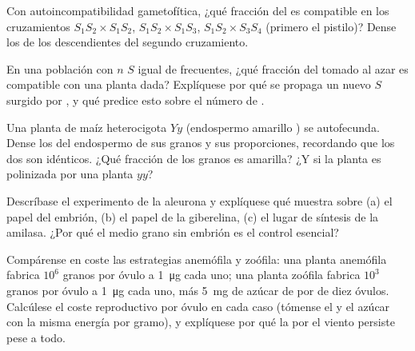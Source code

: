 \begin{exercise}[$\star\star$]\label{exo:b2:angiosperm-reproduction:6}
Con autoincompatibilidad gametofítica, ¿qué fracción del  es
compatible en los cruzamientos $S_1S_2\times S_1S_2$, $S_1S_2\times
S_1S_3$, $S_1S_2\times S_3S_4$ (primero el pistilo)? Dense los
 de los descendientes del segundo cruzamiento.
\end{exercise}

\begin{exercise}[$\star\star$]\label{exo:b2:angiosperm-reproduction:7}
En una población con $n$  $S$ igual de frecuentes, ¿qué fracción
del  tomado al azar es compatible con una planta dada? Explíquese
por qué se propaga un nuevo  $S$ surgido por , y qué predice
esto sobre el número de .
\end{exercise}

\begin{exercise}[$\star\star$]\label{exo:b2:angiosperm-reproduction:8}
Una planta de maíz heterocigota $Yy$ (endospermo amarillo ) se
autofecunda. Dense los  del endospermo de sus granos y sus
proporciones, recordando que los dos  son idénticos. ¿Qué
fracción de los granos es amarilla? ¿Y si la planta es polinizada por una
planta $yy$?
\end{exercise}

\begin{exercise}[$\star\star$]\label{exo:b2:angiosperm-reproduction:9}
Descríbase el experimento de la aleurona y explíquese qué muestra sobre
(a) el papel del embrión, (b) el papel de la giberelina, (c) el lugar de
síntesis de la amilasa. ¿Por qué el medio grano sin embrión es el
control esencial?
\end{exercise}

\begin{exercise}[$\star\star\star$]\label{exo:b2:angiosperm-reproduction:10}
Compárense en coste las estrategias anemófila y zoófila: una planta
anemófila fabrica $10^{6}$ granos por óvulo a \qty{1}{\micro g} cada uno;
una planta zoófila fabrica $10^{3}$ granos por óvulo a \qty{1}{\micro g}
cada uno, más \qty{5}{mg} de azúcar de  por  de diez óvulos.
Calcúlese el coste reproductivo por óvulo en cada caso (tómense el 
y el azúcar con la misma energía por gramo), y explíquese por qué la
 por el viento persiste pese a todo.
\end{exercise}


